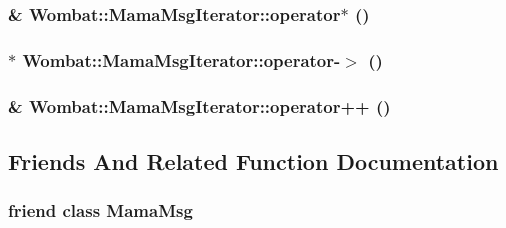 \label{classWombat_1_1MamaMsgIterator_ab2cf7ad587e0357a22e9dd12cfc922db}
\hypertarget{classWombat_1_1MamaMsgIterator_ab5f281bda3dda26efc1059bc642462c8}{
\subsubsection[{operator$\ast$}]{\& Wombat::MamaMsgIterator::operator$\ast$ ()}}
\label{classWombat_1_1MamaMsgIterator_ab5f281bda3dda26efc1059bc642462c8}
\hypertarget{classWombat_1_1MamaMsgIterator_a2e90ac4a110055ad246646e8c01b08b4}{
\subsubsection[{operator-\/$>$}]{$\ast$ Wombat::MamaMsgIterator::operator-\/$>$ ()}}
\label{classWombat_1_1MamaMsgIterator_a2e90ac4a110055ad246646e8c01b08b4}
\hypertarget{classWombat_1_1MamaMsgIterator_a02d8894307ac492d7dad4dbe0ab87757}{
\subsubsection[{operator++}]{\& Wombat::MamaMsgIterator::operator++ ()}}
\label{classWombat_1_1MamaMsgIterator_a02d8894307ac492d7dad4dbe0ab87757}


\subsection{Friends And Related Function Documentation}
\hypertarget{classWombat_1_1MamaMsgIterator_a627b5ab9311b2275c94c0ee886300bd8}{
\subsubsection[{MamaMsg}]{\setlength{\rightskip}{0pt plus 5cm}friend class {\bf MamaMsg}}}
\label{classWombat_1_1MamaMsgIterator_a627b5ab9311b2275c94c0ee886300bd8}


